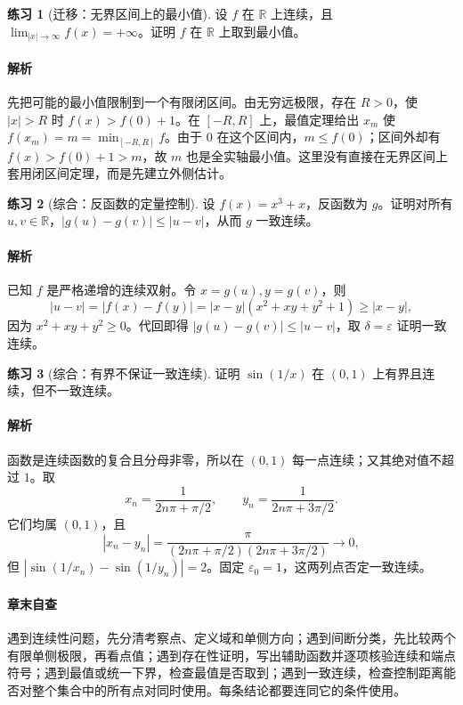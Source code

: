 \documentclass[UTF8,fontset=fandol,12pt,oneside,openany]{ctexrep}
\newcommand{\R}{\mathbb R}
\theoremstyle{definition}
\newtheorem{exercise}{练习}[chapter]
\begin{document}
\begin{exercise}[迁移：无界区间上的最小值]
设 $f$ 在 $\R$ 上连续，且 $\lim_{|x|\to\infty}f(x)=+\infty$。证明 $f$ 在 $\R$ 上取到最小值。
\end{exercise}
\paragraph{解析}
先把可能的最小值限制到一个有限闭区间。由无穷远极限，存在 $R>0$，使 $|x|>R$ 时 $f(x)>f(0)+1$。在 $[-R,R]$ 上，最值定理给出 $x_m$ 使 $f(x_m)=m=\min_{[-R,R]}f$。由于 $0$ 在这个区间内，$m\le f(0)$；区间外却有 $f(x)>f(0)+1>m$，故 $m$ 也是全实轴最小值。这里没有直接在无界区间上套用闭区间定理，而是先建立外侧估计。

\begin{exercise}[综合：反函数的定量控制]
设 $f(x)=x^3+x$，反函数为 $g$。证明对所有 $u,v\in\R$，$|g(u)-g(v)|\le |u-v|$，从而 $g$ 一致连续。
\end{exercise}
\paragraph{解析}
已知 $f$ 是严格递增的连续双射。令 $x=g(u),y=g(v)$，则
\[
 |u-v|=|f(x)-f(y)|
 =|x-y|(x^2+xy+y^2+1)\ge |x-y|,
\]
因为 $x^2+xy+y^2\ge0$。代回即得 $|g(u)-g(v)|\le|u-v|$，取 $\delta=\varepsilon$ 证明一致连续。

\begin{exercise}[综合：有界不保证一致连续]
证明 $\sin(1/x)$ 在 $(0,1)$ 上有界且连续，但不一致连续。
\end{exercise}
\paragraph{解析}
函数是连续函数的复合且分母非零，所以在 $(0,1)$ 每一点连续；又其绝对值不超过 $1$。取
\[
 x_n=\frac1{2n\pi+\pi/2},\qquad
 y_n=\frac1{2n\pi+3\pi/2}.
\]
它们均属 $(0,1)$，且
\[
 |x_n-y_n|=\frac{\pi}{(2n\pi+\pi/2)(2n\pi+3\pi/2)}\to0,
\]
但 $|\sin(1/x_n)-\sin(1/y_n)|=2$。固定 $\varepsilon_0=1$，这两列点否定一致连续。

\paragraph{章末自查}
遇到连续性问题，先分清考察点、定义域和单侧方向；遇到间断分类，先比较两个有限单侧极限，再看点值；遇到存在性证明，写出辅助函数并逐项核验连续和端点符号；遇到最值或统一下界，检查最值是否取到；遇到一致连续，检查控制距离能否对整个集合中的所有点对同时使用。每条结论都要连同它的条件使用。
\end{document}
